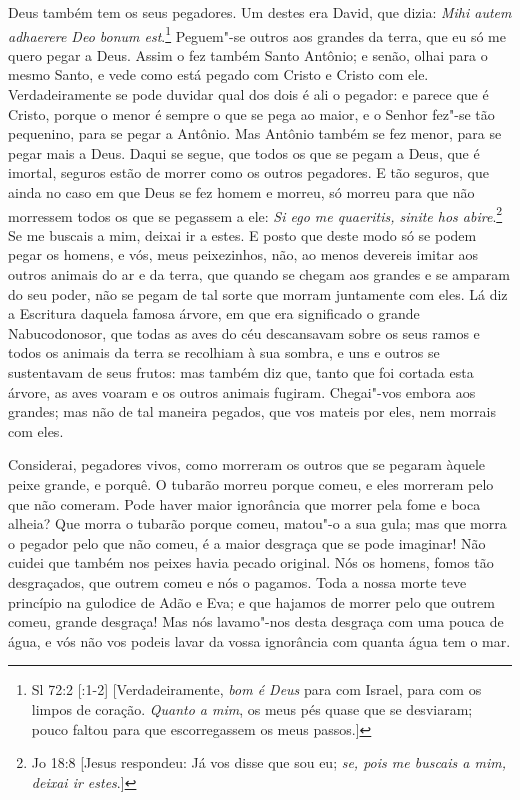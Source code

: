 Deus também tem os seus pegadores. Um destes era David, que dizia:
\emph{Mihi autem adhaerere Deo bonum est}.\footnote{Sl 72:2 [:1-2] [Verdadeiramente, \emph{bom é Deus} para com Israel, para com os limpos de coração. \emph{Quanto a mim}, os meus pés quase que se desviaram; pouco faltou para que escorregassem os meus passos.]} Peguem"-se outros aos grandes
da terra, que eu só me quero pegar a Deus. Assim o fez também Santo
Antônio; e senão, olhai para o mesmo Santo, e vede como está pegado com
Cristo e Cristo com ele. Verdadeiramente se pode duvidar qual dos dois é
ali o pegador: e parece que é Cristo, porque o menor é sempre o que se
pega ao maior, e o Senhor fez"-se tão pequenino, para se pegar a Antônio.
Mas Antônio também se fez menor, para se pegar mais a Deus. Daqui se
segue, que todos os que se pegam a Deus, que é imortal, seguros estão de
morrer como os outros pegadores. E tão seguros, que ainda no caso em que
Deus se fez homem e morreu, só morreu para que não morressem todos os
que se pegassem a ele: \emph{Si ego me quaeritis, sinite hos abire}.\footnote{Jo 18:8 [Jesus respondeu: Já vos disse que sou eu; \emph{se, pois me buscais a mim, deixai ir estes}.]}
Se me buscais a mim, deixai ir a estes. E posto que deste modo só se
podem pegar os homens, e vós, meus peixezinhos, não, ao menos devereis
imitar aos outros animais do ar e da terra, que quando se chegam aos
grandes e se amparam do seu poder, não se pegam de tal sorte que morram
juntamente com eles. Lá diz a Escritura daquela famosa árvore, em que
era significado o grande Nabucodonosor, que todas as aves do céu
descansavam sobre os seus ramos e todos os animais da terra se recolhiam
à sua sombra, e uns e outros se sustentavam de seus frutos: mas
também diz que, tanto que foi cortada esta árvore, as aves voaram e os
outros animais fugiram. Chegai"-vos embora aos grandes; mas não de tal
maneira pegados, que vos mateis por eles, nem morrais com eles.

Considerai, pegadores vivos, como morreram os outros que se pegaram
àquele peixe grande, e porquê. O tubarão morreu porque comeu, e eles
morreram pelo que não comeram. Pode haver maior ignorância que morrer
pela fome e boca alheia? Que morra o tubarão porque comeu, matou"-o a sua
gula; mas que morra o pegador pelo que não comeu, é a maior desgraça que
se pode imaginar! Não cuidei que também nos peixes havia pecado
original. Nós os homens, fomos tão desgraçados, que outrem comeu e nós o
pagamos. Toda a nossa morte teve princípio na gulodice de Adão e Eva; e
que hajamos de morrer pelo que outrem comeu, grande desgraça! Mas nós
lavamo"-nos desta desgraça com uma pouca de água, e vós não vos podeis
lavar da vossa ignorância com quanta água tem o mar.

